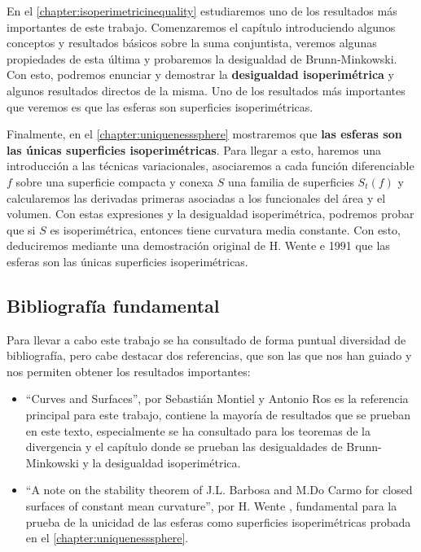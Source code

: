 En el \autoref{chapter:isoperimetricinequality} estudiaremos uno de los resultados más importantes de este trabajo. Comenzaremos el capítulo introduciendo algunos conceptos y resultados básicos sobre la suma conjuntista, veremos algunas propiedades de esta última y probaremos la desigualdad de Brunn-Minkowski. Con esto, podremos enunciar y demostrar la \textbf{desigualdad isoperimétrica} y algunos resultados directos de la misma. Uno de los resultados más importantes que veremos es que las esferas son superficies isoperimétricas.

Finalmente, en el \autoref{chapter:uniquenesssphere} mostraremos que \textbf{las esferas son las únicas superficies isoperimétricas}. Para llegar a esto, haremos una introducción a las técnicas variacionales, asociaremos a cada función diferenciable $f$ sobre una superficie compacta y conexa $S$ una familia de superficies $S_t(f)$ y calcularemos las derivadas primeras asociadas a los funcionales del área y el volumen. Con estas expresiones y la desigualdad isoperimétrica, podremos probar que si $S$ es isoperimétrica, entonces tiene curvatura media constante. Con esto, deduciremos mediante una demostración original de H. Wente e 1991 que las esferas son las únicas superficies isoperimétricas.

\subsection{Bibliografía fundamental}

Para llevar a cabo este trabajo se ha consultado de forma puntual diversidad de bibliografía, pero cabe destacar dos referencias, que son las que nos han guiado y nos permiten obtener los resultados importantes:

\begin{itemize}
    \item ``Curves and Surfaces'', por Sebastián Montiel y Antonio Ros \cite{montielrosbook} es la referencia principal para este trabajo, contiene la mayoría de resultados que se prueban en este texto, especialmente se ha consultado para los teoremas de la divergencia y el capítulo donde se prueban las desigualdades de Brunn-Minkowski y la desigualdad isoperimétrica.
    \item ``A note on the stability theorem of J.L. Barbosa and M.Do Carmo for closed surfaces of constant mean curvature'', por H. Wente \cite{wenteproof}, fundamental para la prueba de la unicidad de las esferas como superficies isoperimétricas probada en el \autoref{chapter:uniquenesssphere}.
\end{itemize}

